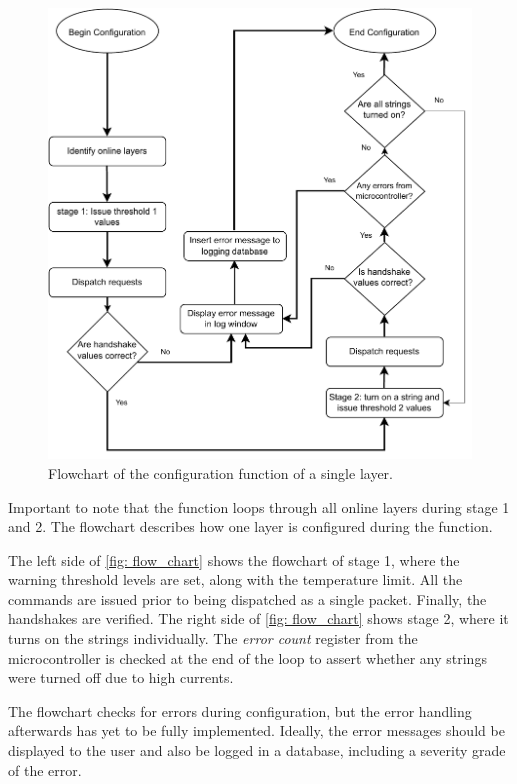 \documentclass[main.tex]{subfiles}
\begin{document}
\begin{figure}[!ht]
    \centering
    \includegraphics[width=12cm, scale=1.5]{images/Configuration Flowchart.pdf}
    \caption{Flowchart of the configuration function of a single layer.}
    \label{fig: flow_chart}
\end{figure}
\FloatBarrier

Important to note that the function loops through all online layers during stage 1 and 2. The flowchart describes how one layer is configured during the function.

The left side of \autoref{fig: flow_chart} shows the flowchart of stage 1, where the warning threshold levels are set, along with the temperature limit. All the commands are issued prior to being dispatched as a single packet. Finally, the handshakes are verified. The right side of \autoref{fig: flow_chart} shows stage 2, where it turns on the strings individually. The \textit{error count} register from the microcontroller is checked at the end of the loop to assert whether any strings were turned off due to high currents. 

The flowchart checks for errors during configuration, but the error handling afterwards has yet to be fully implemented. Ideally, the error messages should be displayed to the user and also be logged in a database, including a severity grade of the error.
\end{document}
